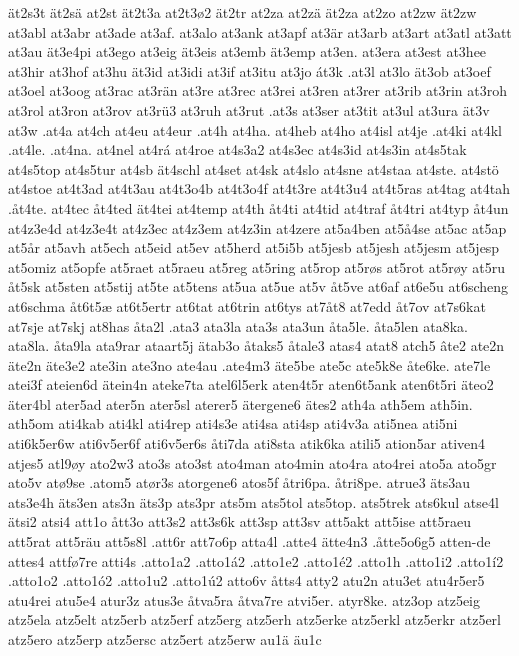 ät2s3t
ät2sä
at2st
ät2t3a
at2t3ø2
ät2tr
at2za
at2zä
ät2za
at2zo
at2zw
ät2zw
at3abl
at3abr
at3ade
at3af.
at3alo
at3ank
at3apf
at3är
at3arb
at3art
at3atl
at3att
at3au
ät3e4pi
at3ego
at3eig
ät3eis
at3emb
ät3emp
at3en.
at3era
at3est
at3hee
at3hir
at3hof
at3hu
ät3id
at3idi
at3if
at3itu
at3jo
át3k
.at3l
at3lo
ät3ob
at3oef
at3oel
at3oog
at3rac
at3rän
at3re
at3rec
at3rei
at3ren
at3rer
at3rib
at3rin
at3roh
at3rol
at3ron
at3rov
at3rü3
at3ruh
at3rut
.at3s
at3ser
at3tit
at3ul
at3ura
ät3v
at3w
.at4a
at4ch
at4eu
at4eur
.at4h
at4ha.
at4heb
at4ho
at4isl
at4je
.at4ki
at4kl
.at4le.
.at4na.
at4nel
at4rá
at4roe
at4s3a2
at4s3ec
at4s3id
at4s3in
at4s5tak
at4s5top
at4s5tur
at4sb
ät4schl
at4set
at4sk
at4slo
at4sne
at4staa
at4ste.
at4stö
at4stoe
at4t3ad
at4t3au
at4t3o4b
at4t3o4f
at4t3re
at4t3u4
at4t5ras
at4tag
at4tah
.åt4te.
at4tec
åt4ted
ät4tei
at4temp
at4th
åt4ti
at4tid
at4traf
åt4tri
at4typ
åt4un
at4z3e4d
at4z3e4t
at4z3ec
at4z3em
at4z3in
at4zere
at5a4ben
at5å4se
at5ac
at5ap
at5år
at5avh
at5ech
at5eid
at5ev
at5herd
at5i5b
at5jesb
at5jesh
at5jesm
at5jesp
at5omiz
at5opfe
at5raet
at5raeu
at5reg
at5ring
at5rop
at5røs
at5rot
at5røy
at5ru
åt5sk
at5sten
at5stij
at5te
at5tens
at5ua
at5ue
at5v
åt5ve
at6af
at6e5u
at6scheng
at6schma
åt6t5æ
at6t5ertr
at6tat
at6trin
at6tys
at7åt8
at7edd
åt7ov
at7s6kat
at7sje
at7skj
at8has
åta2l
.ata3
ata3la
ata3s
ata3un
åta5le.
åta5len
ata8ka.
ata8la.
åta9la
ata9rar
ataart5j
ätab3o
åtaks5
åtale3
atas4
atat8
atch5
âte2
ate2n
äte2n
äte3e2
ate3in
ate3no
ate4au
.ate4m3
äte5be
ate5c
ate5k8e
åte6ke.
ate7le
atei3f
ateien6d
ätein4n
ateke7ta
atel6l5erk
aten4t5r
aten6t5ank
aten6t5ri
äteo2
äter4bl
ater5ad
ater5n
ater5sl
aterer5
ätergene6
ätes2
ath4a
ath5em
ath5in.
ath5om
ati4kab
ati4kl
ati4rep
ati4s3e
ati4sa
ati4sp
ati4v3a
ati5nea
ati5ni
ati6k5er6w
ati6v5er6f
ati6v5er6s
åti7da
ati8sta
atik6ka
atili5
ation5ar
ativen4
atjes5
atl9øy
ato2w3
ato3s
ato3st
ato4man
ato4min
ato4ra
ato4rei
ato5a
ato5gr
ato5v
atø9se
.atom5
atør3s
atorgene6
atos5f
åtri6pa.
åtri8pe.
atrue3
äts3au
ats3e4h
äts3en
ats3n
äts3p
ats3pr
ats5m
ats5tol
ats5top.
ats5trek
ats6kul
atse4l
ätsi2
atsi4
att1o
ått3o
att3s2
att3s6k
att3sp
att3sv
att5akt
att5ise
att5raeu
att5rat
att5räu
att5s8l
.att6r
att7o6p
atta4l
.atte4
ätte4n3
.åtte5o6g5
atten-de
attes4
attfø7re
atti4s
.atto1a2
.atto1á2
.atto1e2
.atto1é2
.atto1h
.atto1i2
.atto1í2
.atto1o2
.atto1ó2
.atto1u2
.atto1ú2
atto6v
åtts4
atty2
atu2n
atu3et
atu4r5er5
atu4rei
atu5e4
atur3z
atus3e
åtva5ra
åtva7re
atvi5er.
atyr8ke.
atz3op
atz5eig
atz5ela
atz5elt
atz5erb
atz5erf
atz5erg
atz5erh
atz5erke
atz5erkl
atz5erkr
atz5erl
atz5ero
atz5erp
atz5ersc
atz5ert
atz5erw
au1ä
äu1c
